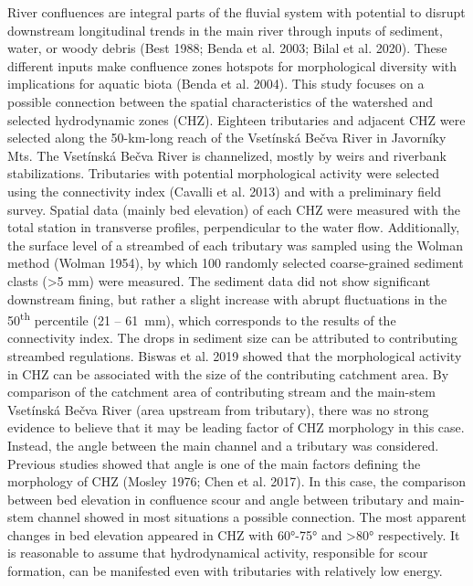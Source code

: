 {
River confluences are integral parts of the fluvial system with potential to disrupt downstream longitudinal trends in the main river through inputs of sediment, water, or woody debris (Best 1988; Benda et al. 2003; Bilal et al. 2020). These different inputs make confluence zones hotspots for morphological diversity with implications for aquatic biota (Benda et al. 2004). This study focuses on a possible connection between the spatial characteristics of the watershed and selected hydrodynamic zones (CHZ). Eighteen tributaries and adjacent CHZ were selected along the 50-km-long reach of the Vsetínská Bečva River in Javorníky Mts. The Vsetínská Bečva River is channelized, mostly by weirs and riverbank stabilizations. Tributaries with potential morphological activity were selected using the connectivity index (Cavalli et al. 2013) and with a preliminary field survey. Spatial data (mainly bed elevation) of each CHZ were measured with the total station in transverse profiles, perpendicular to the water flow. Additionally, the surface level of a streambed of each tributary was sampled using the Wolman method (Wolman 1954), by which 100 randomly selected coarse-grained sediment clasts (>5 mm) were measured. The sediment data did not show significant downstream fining, but rather a slight increase with abrupt fluctuations in the 50\textsuperscript{th} percentile (21 -- 61~mm), which corresponds to the results of the connectivity index. The drops in sediment size can be attributed to contributing streambed regulations. Biswas et al. 2019 showed that the morphological activity in CHZ can be associated with the size of the contributing catchment area. By comparison of the catchment area of contributing stream and the main-stem Vsetínská Bečva River (area upstream from tributary), there was no strong evidence to believe that it may be leading factor of CHZ morphology in this case. Instead, the angle between the main channel and a tributary was considered. Previous studies showed that angle is one of the main factors defining the morphology of CHZ (Mosley 1976; Chen et al. 2017). In this case, the comparison between bed elevation in confluence scour and angle between tributary and main-stem channel showed in most situations a possible connection. The most apparent changes in bed elevation appeared in CHZ with 60°-75° and >80° respectively. It is reasonable to assume that hydrodynamical activity, responsible for scour formation, can be manifested even with tributaries with relatively low energy.
}
